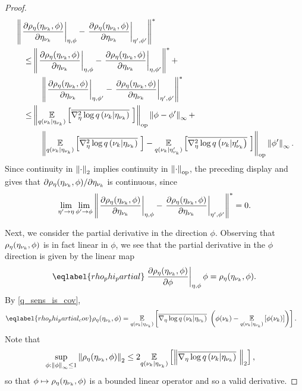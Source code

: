 \begin{thm}
\begin{proof}
%
\begin{align*}
%
\MoveEqLeft
%
\norm{\fracat{\partial \rho_\eta(\etanuk, \phi)}{\partial \etanuk}{\eta, \phi} -
      \fracat{\partial \rho_\eta(\etanuk, \phi)}{\partial \etanuk}{\eta', \phi'}
      }^* \\ \le
%
& \norm{\fracat{\partial \rho_\eta(\etanuk, \phi)}{\partial \etanuk}{\eta, \phi} -
        \fracat{\partial \rho_\eta(\etanuk, \phi)}{\partial \etanuk}{\eta, \phi'}
    }^* + \\&\quad
\norm{\fracat{\partial \rho_\eta(\etanuk, \phi)}{\partial \etanuk}{\eta, \phi'} -
      \fracat{\partial \rho_\eta(\etanuk, \phi)}{\partial \etanuk}{\eta', \phi'}
    }^* \\ \le
%
& \normop{
    \expect{\q(\nuk \vert \etanuk)}
           {\lqhessbar{\nuk \vert \etanuk}}
    } \norminf{\phi - \phi'} + \\&\quad
\normop{
    \expect{\q(\nuk \vert \etanuk)}{\lqhessbar{\nuk \vert \etanuk}} -
    \expect{\q(\nuk \vert \etanuk')}{\lqhessbar{\nuk \vert \etanuk'}}
  } \norminf{\phi'}.
%
\end{align*}
%
Since continuity in $\left\Vert\cdot\right\Vert_2$ implies continuity in $\left\Vert\cdot\right\Vert_{\mathrm{op}}$,
the preceding display and  gives that
$\partial \rho_\eta(\eta_{\nu_{k}}, \phi) / \partial \eta_{\nu_{k}}$ is continuous,
since
%
\begin{align*}
%
\lim_{\eta' \rightarrow \eta} \lim_{\phi' \rightarrow \phi}
\norm{\fracat{\partial \rho_\eta(\etanuk, \phi)}{\partial \etanuk}{\eta, \phi} -
      \fracat{\partial \rho_\eta(\etanuk, \phi)}{\partial \etanuk}{\eta', \phi'}
      }^* = 0.
%
\end{align*}

Next, we consider the partial derivative in the direction $\phi$.  Observing
that $\rho_\eta(\eta_{\nu_{k}}, \phi)$ is in fact linear in $\phi$, we see that the
partial derivative in the $\phi$ direction is given by the linear map
%
\begin{align}\eqlabel{rho_phi_partial}
%
\fracat{\partial \rho_\eta(\etanuk, \phi)}
       {\partial \phi}{\eta, \phi} \phi =
    \rho_\eta(\etanuk, \phi).
%
\end{align}
%
By  \eqref{q_sens_is_cov},
%
\begin{align}\eqlabel{rho_phi_partial_cov}
%
\rho_\eta(\etanuk, \phi) ={}&
\expect{\q(\nuk \vert \etanuk)}
       {\lqgradbar{\nuk \vert \etanuk} \left(
        \phi(\nuk) - \expect{\q(\nuk \vert \etanuk)}{\phi(\nuk)}
       \right)
       }.
%
\end{align}
%
Note that
%
\begin{align*}
%
\sup_{\phi: \norminf{\phi} \le 1} \norm{\rho_\eta(\etanuk, \phi)}_2 \le{}&
    2 \expect{\q(\nuk \vert \etanuk)}
             {\norm{\lqgradbar{\nuk \vert \etanuk}}_2
             },
%
\end{align*}
%
so that $\phi \mapsto \rho_\eta(\eta_{\nu_{k}}, \phi)$ is a bounded linear operator and
so a valid derivative.


\end{proof}
\end{thm}
